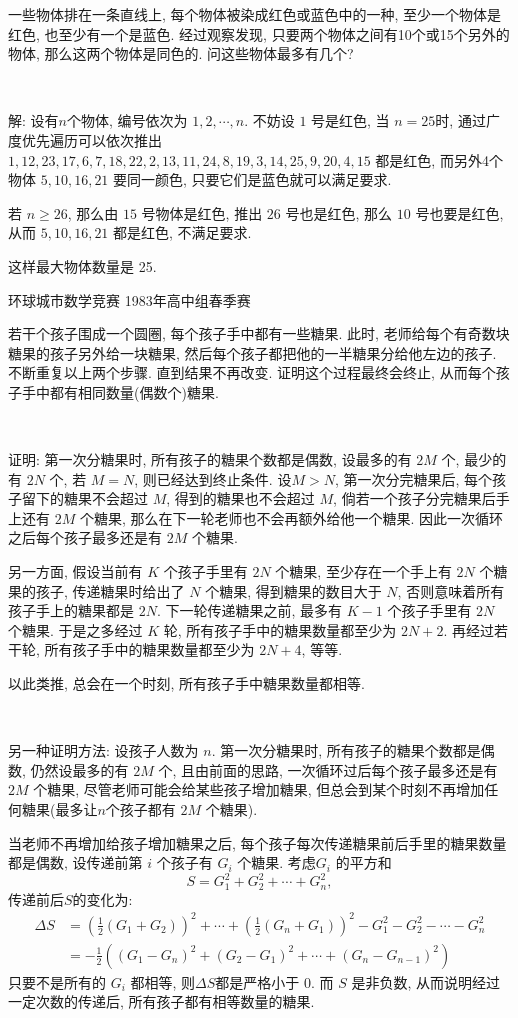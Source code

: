 一些物体排在一条直线上, 每个物体被染成红色或蓝色中的一种, 至少一个物体是红色, 也至少有一个是蓝色. 经过观察发现, 只要两个物体之间有10个或15个另外的物体, 那么这两个物体是同色的. 问这些物体最多有几个?

~

解: 设有$n$个物体, 编号依次为 $1,2,\cdots,n$. 不妨设 $1$ 号是红色, 当 $n=25$时, 通过广度优先遍历可以依次推出 $1, 12, 23, 17, 6, 7, 18, 22, 2, 13, 11, 24, 8, 19, 3, 14, 25, 9, 20, 4, 15$ 都是红色, 而另外4个物体 $5, 10, 16, 21$ 要同一颜色, 只要它们是蓝色就可以满足要求. 

若 $n\ge 26$, 那么由 $15$ 号物体是红色, 推出 $26$ 号也是红色, 那么 $10$ 号也要是红色, 从而 $5,10,16,21$ 都是红色, 不满足要求.

这样最大物体数量是 25.

\newpage
\noindent 环球城市数学竞赛 1983年高中组春季赛

若干个孩子围成一个圆圈, 每个孩子手中都有一些糖果. 此时, 老师给每个有奇数块糖果的孩子另外给一块糖果, 然后每个孩子都把他的一半糖果分给他左边的孩子. 不断重复以上两个步骤. 直到结果不再改变. 证明这个过程最终会终止, 从而每个孩子手中都有相同数量(偶数个)糖果.

~

证明: 第一次分糖果时, 所有孩子的糖果个数都是偶数, 设最多的有 $2M$ 个, 最少的有 $2N$ 个, 若 $M=N$, 则已经达到终止条件. 设$M>N$, 第一次分完糖果后, 每个孩子留下的糖果不会超过 $M$, 得到的糖果也不会超过 $M$, 倘若一个孩子分完糖果后手上还有 $2M$ 个糖果, 那么在下一轮老师也不会再额外给他一个糖果. 因此一次循环之后每个孩子最多还是有 $2M$ 个糖果. 

另一方面, 假设当前有 $K$ 个孩子手里有 $2N$ 个糖果, 至少存在一个手上有 $2N$ 个糖果的孩子, 传递糖果时给出了 $N$ 个糖果, 得到糖果的数目大于 $N$, 否则意味着所有孩子手上的糖果都是 $2N$. 下一轮传递糖果之前, 最多有 $K - 1$ 个孩子手里有 $2N$ 个糖果. 于是之多经过 $K$ 轮, 所有孩子手中的糖果数量都至少为 $2N+2$. 再经过若干轮, 所有孩子手中的糖果数量都至少为 $2N+4$, 等等.

以此类推, 总会在一个时刻, 所有孩子手中糖果数量都相等.

~

另一种证明方法: 设孩子人数为 $n$. 第一次分糖果时, 所有孩子的糖果个数都是偶数, 仍然设最多的有 $2M$ 个, 且由前面的思路, 一次循环过后每个孩子最多还是有 $2M$ 个糖果, 尽管老师可能会给某些孩子增加糖果, 但总会到某个时刻不再增加任何糖果(最多让$n$个孩子都有 $2M$ 个糖果).

当老师不再增加给孩子增加糖果之后, 每个孩子每次传递糖果前后手里的糖果数量都是偶数, 设传递前第 $i$ 个孩子有 $G_i$ 个糖果. 考虑$G_i$ 的平方和
\[S = G_1^2 + G_2^2 + \cdots + G_n^2 ,\]
传递前后$S$的变化为:
\begin{align*}
\Delta S &= \left(\frac{1}{2}(G_1+G_2)\right)^2 + \cdots + \left(\frac{1}{2}(G_n+G_1)\right)^2 - G_1^2 - G_2^2 - \cdots - G_n^2 \\
&= -\frac{1}{2}\left((G_1 - G_n)^2 + (G_2-G_1)^2 + \cdots + (G_n - G_{n-1})^2\right)
\end{align*}
只要不是所有的 $G_i$ 都相等, 则$\Delta S$都是严格小于 0. 而 $S$ 是非负数, 从而说明经过一定次数的传递后, 所有孩子都有相等数量的糖果.



